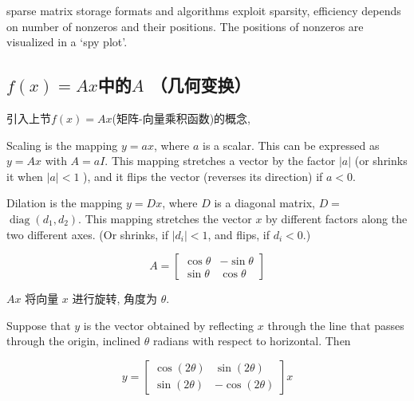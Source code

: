 sparse matrix storage formats and algorithms exploit sparsity, efficiency depends on number of nonzeros and their positions. The positions of nonzeros are visualized in a `spy plot'.

\subsection{$f(x)=A x$中的$A$ （几何变换）}

引入上节$f(x)=A x$(矩阵-向量乘积函数)的概念,

\begin{definition}[Scaling]
    Scaling is the mapping $ y=a x $, where $ a $ is a scalar. This can be expressed as $ y=A x $ with $ A=a I $. This mapping stretches a vector by the factor $ |a| $ (or shrinks it when $ |a|<1 $ ), and it flips the vector (reverses its direction) if $ a<0 $.
\end{definition}

\begin{definition}[Dilation]
    Dilation is the mapping $ y=D x $, where $ D $ is a diagonal matrix, $ D= $ $ \operatorname{diag}\left(d_{1}, d_{2}\right) $. This mapping stretches the vector $ x $ by different factors along the two different axes. (Or shrinks, if $ \left|d_{i}\right|<1 $, and flips, if $ d_{i}<0 $.)
\end{definition}







\begin{definition}[旋转矩阵]
    $$ A=\left[\begin{array}{cc}\cos \theta & -\sin \theta \\ \sin \theta & \cos \theta\end{array}\right] $$

    $ {A} x $ 将向量 $ x $ 进行旋转, 角度为 $ \theta $.
\end{definition}

\begin{definition}
    Suppose that $y$ is the vector obtained by reflecting $x$ through the line
    that passes through the origin, inclined $\theta$ radians with respect to horizontal. Then

    $$ y=\left[\begin{array}{rr}\cos (2 \theta) & \sin (2 \theta) \\ \sin (2 \theta) & -\cos (2 \theta)\end{array}\right] x $$
\end{definition}


